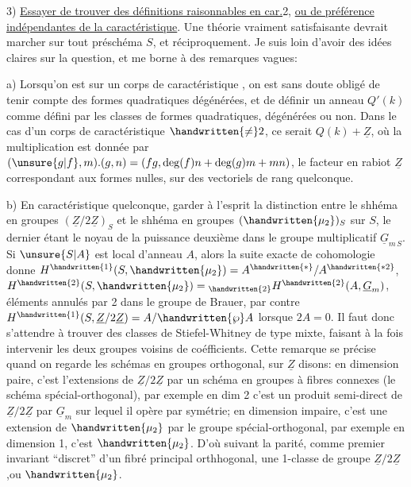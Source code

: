 3) \uline{Essayer de trouver des définitions raisonnables en car.}2, \uline{ou de préférence indépendantes de la caractéristique}. Une théorie vraiment satisfaisante devrait marcher sur tout préschéma $S$, et réciproquement. Je suis loin d'avoir des idées claires sur la question, et me borne à des remarques vagues:

a) Lorsqu'on est sur un corps de caractéristique , on est sans doute obligé de tenir compte des formes quadratiques dégénérées, et de définir un anneau $Q'(k)$ comme défini par les classes de formes quadratiques, dégénérées ou non. \handwritten{[}Dans le cas d'un corps de  caractéristique $\handwritten{\ne}2$, ce serait $Q(k)+\underline{Z}$, où la  multiplication est donnée par $(\unsure{g|f},m).(g,n)=(fg,\deg(f)n+\deg(g)m+mn)$, le facteur en rabiot $\underline{Z}$ correspondant aux formes nulles, sur des vectoriels de rang quelconque\handwritten{]}.

b) En caractéristique quelconque, garder à l'esprit la distinction entre le shhéma en groupes $(\underline{Z}/2\underline{Z})_S$ et le shhéma en groupes $(\handwritten{\mu_2})_S$ sur $S$, le dernier étant le noyau de la puissance deuxième dans le groupe multiplicatif $\underline{G}_{m\,S}$. Si $\unsure{S|A}$ est local d'anneau $A$, alors la suite exacte de cohomologie donne $H^{\handwritten{1}}(S,\handwritten{\mu_2})=A^{\handwritten{*}}/A^{\handwritten{*2}}$, $H^{\handwritten{2}}(S,\handwritten{\mu_2})={}_{\handwritten{2}}H^{\handwritten{2}}(A,\underline{G}_m)$, éléments annulés par 2 dans le groupe de Brauer, par contre $H^{\handwritten{1}}(S,\underline{Z}/2\underline{Z})=A/\handwritten{\wp}A$ lorsque $2A=0$. Il faut donc s'attendre à trouver des classes de Stiefel-Whitney de type mixte, faisant à la fois intervenir les deux groupes voisins de coéfficients. Cette remarque se précise quand on regarde les schémas en groupes orthogonal, sur $\underline{Z}$ disons: en dimension paire, c'est l'extensions de $\underline{Z}/2\underline{Z}$ par un schéma en groupes à fibres connexes (le schéma spécial-orthogonal), par exemple en dim 2 c'est  un produit semi-direct de $\underline{Z}/2\underline{Z}$ par $\underline{G}_m$ sur lequel il opère par symétrie; en dimension impaire, c'est une extension de $\handwritten{\mu_2}$ par le groupe spécial-orthogonal, par exemple en dimension 1, c'est $\handwritten{\mu_2}$. D'où suivant la parité, comme premier invariant ``discret'' d'un fibré principal orthhogonal, une 1-classe de groupe $\underline{Z}/2\underline{Z}$,ou $\handwritten{\mu_2}$.


